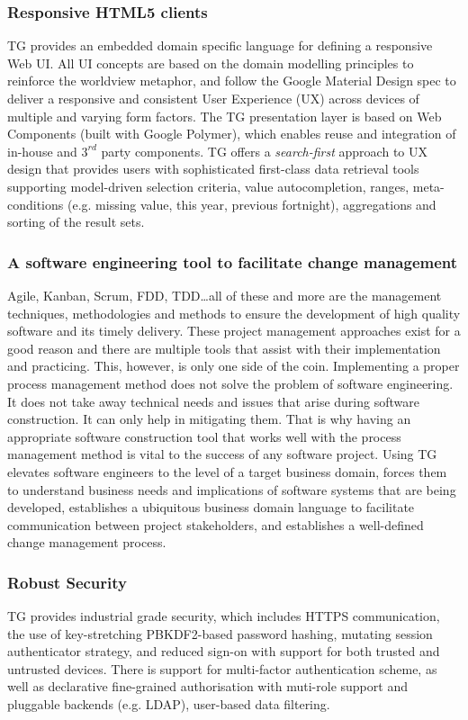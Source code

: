 \documentclass[a4paper,10pt,twocolumn,oneside,openright,final]{memoir}
\begin{document}

\subsubsection*{Responsive HTML5 clients}
	TG provides an embedded domain specific language for defining a responsive Web UI.
	All UI concepts are based on the domain modelling principles to reinforce the worldview metaphor, and follow the Google Material Design spec to deliver a responsive and consistent User Experience (UX) across devices of multiple and varying form factors.
	The TG presentation layer is based on Web Components (built with Google Polymer), which enables reuse and integration of in-house and $3^{rd}$ party components.
	TG offers a \emph{search-first} approach to UX design that provides users with sophisticated first-class data retrieval tools supporting model-driven selection criteria, value autocompletion, ranges, meta-conditions (e.g. missing value, this year, previous fortnight), aggregations and sorting of the result sets.


\subsubsection*{A software engineering tool to facilitate change management}
	Agile, Kanban, Scrum, FDD, TDD\ldots all of these and more are the management techniques, methodologies and methods to ensure the development of high quality software and its timely delivery.
	These project management approaches exist for a good reason and there are multiple tools that assist with their implementation and practicing.
	This, however, is only one side of the coin.
	Implementing a proper process management method does not solve the problem of software engineering.
	It does not take away technical needs and issues that arise during software construction.
	It can only help in mitigating them.
	That is why having an appropriate software construction tool that works well with the process management method is vital to the success of any software project.
	Using TG elevates software engineers to the level of a target business domain, forces them to understand business needs and implications of software systems that are being developed, establishes a ubiquitous business domain language to facilitate communication between project stakeholders, and establishes a well-defined change management process.

\subsubsection*{Robust Security}
	TG provides industrial grade security, which includes HTTPS communication, the use of key-stretching PBKDF2-based password hashing, mutating session authenticator strategy, and reduced sign-on with support for both trusted and untrusted devices.
	There is support for multi-factor authentication scheme, as well as declarative fine-grained authorisation with muti-role support and pluggable backends (e.g. LDAP), user-based data filtering.
\end{document}

